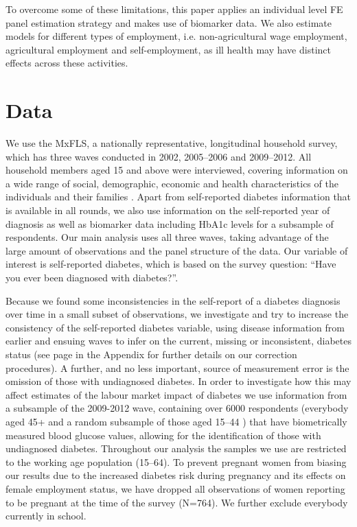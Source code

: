 To overcome some of these limitations, this paper applies an individual level \ac{FE} panel estimation strategy and makes use of biomarker data. We also estimate models for different types of employment, i.e. non-agricultural wage employment, agricultural employment and self-employment, as ill health may have distinct effects across these activities.
\section{\label{sec:Data}Data}

We use the \acf{MxFLS}, a nationally representative, longitudinal household survey, which has three waves conducted in 2002, 2005--2006 and 2009--2012. All household members aged 15 and above were interviewed, covering information on a wide range of social, demographic, economic and health characteristics of the individuals and their families \parencite{Rubalcava2013}. Apart from self-reported diabetes information that is available in all rounds, we also use information on the self-reported year of diagnosis as well as biomarker data including \ac{HbA1c} levels for a subsample of respondents.  Our main analysis uses all three waves, taking advantage of the large amount of observations and the panel structure of the data. Our variable of interest is self-reported diabetes, which is based on the survey question: ``Have you ever been diagnosed with diabetes?''. 

Because we found some inconsistencies in the self-report of a diabetes diagnosis over time in a small subset of observations, we investigate and try to increase the consistency of the self-reported diabetes variable, using disease information from earlier and ensuing waves to infer on the current, missing or inconsistent, diabetes status (see page \pageref{appendix_cha4_inconsist} in the Appendix for further details on our correction procedures). A further, and no less important, source of measurement error is the omission of those with undiagnosed diabetes. In order to investigate how this may affect estimates of the labour market impact of diabetes we use information from a subsample of the 2009-2012 wave, containing over 6000 respondents (everybody aged 45+  and a random subsample of those aged 15--44 \parencite{Crimmins2015}) that have biometrically measured blood glucose values, allowing for the identification of those with undiagnosed diabetes. 
Throughout our analysis the samples we use are restricted to the working age population (15--64). To prevent pregnant women from biasing our results due to the increased diabetes risk during pregnancy and its effects on female employment status, we have dropped all observations of women reporting to be pregnant at the time of the survey (N=764). We further exclude everybody currently in school.

